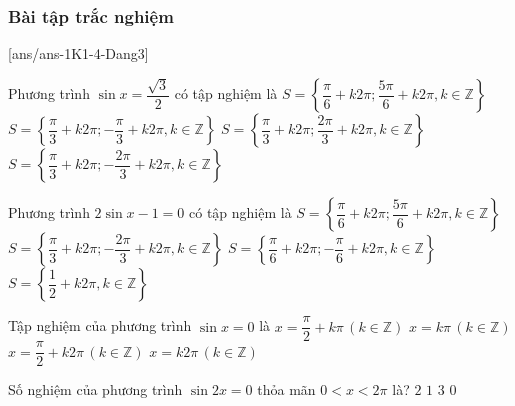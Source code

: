\subsubsection{Bài tập trắc nghiệm}
[ans/ans-1K1-4-Dang3]

\begin{ex}%
	Phương trình $\sin x=\dfrac{\sqrt{3}}{2}$ có tập nghiệm là
	\choice
	{$S=\left\{\dfrac{\pi}{6}+k2\pi;\dfrac{5\pi}{6}+k2\pi,k\in \mathbb{Z}\right\}$}
	{$S=\left\{\dfrac{\pi}{3}+k2\pi;-\dfrac{\pi}{3}+k2\pi,k\in \mathbb{Z}\right\}$}
	{\True $S=\left\{\dfrac{\pi}{3}+k2\pi;\dfrac{2\pi}{3}+k2\pi,k\in \mathbb{Z}\right\}$}
	{$S=\left\{\dfrac{\pi}{3}+k2\pi;-\dfrac{2\pi}{3}+k2\pi,k\in \mathbb{Z}\right\}$}
\end{ex}
\begin{ex}%
	Phương trình $2\sin x-1=0$ có tập nghiệm là
	\choice
	{\True $S=\left\{\dfrac{\pi}{6}+k2\pi;\dfrac{5\pi}{6}+k2\pi,k\in \mathbb{Z}\right\}$}
	{$S=\left\{\dfrac{\pi}{3}+k2\pi;-\dfrac{2\pi}{3}+k2\pi,k\in \mathbb{Z}\right\}$}
	{$S=\left\{\dfrac{\pi}{6}+k2\pi;-\dfrac{\pi}{6}+k2\pi,k\in \mathbb{Z}\right\}$}
	{$S=\left\{\dfrac{1}{2}+k2\pi,k\in \mathbb{Z}\right\}$}
\end{ex}
\begin{ex}%
	Tập nghiệm của phương trình $\sin x=0$ là
	\choice
	{$x=\dfrac{\pi}{2}+k\pi \, (k\in \mathbb{Z})$}
	{\True $x=k\pi \, (k\in \mathbb{Z})$}
	{$x=\dfrac{\pi}{2}+k2\pi \, (k\in \mathbb{Z})$}
	{$x=k2\pi \, (k\in \mathbb{Z})$}
\end{ex}
\begin{ex}%
	Số nghiệm của phương trình $\sin 2x=0$ thỏa mãn $0<x<2\pi$ là?
	\choice
	{$2$}
	{$1$}
	{\True $3$}
	{$0$}
\end{ex}
